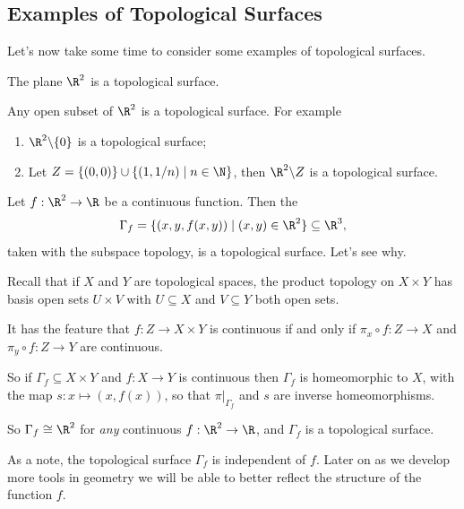 \subsection{Examples of Topological Surfaces}

Let's now take some time to consider some examples of topological surfaces.

\begin{example}[$\R^2$]
    The plane $\R^2$ is a topological surface.
\end{example}

\begin{example}[Subsets of $\R^2$]
    Any open subset of $\R^2$ is a topological surface. For example
    \begin{enumerate}[label=(\roman*)]
        \item $\R^2 \backslash \{0\}$ is a topological surface;
        \item Let $Z = \{(0, 0) \} \cup \{(1, 1/n) \mid n \in \N\}$, then $\R^2 \backslash Z$ is a topological surface.
    \end{enumerate}
\end{example}

\begin{example}[Graphs]
    Let $f: \R^2 \rightarrow \R$ be a continuous function. Then the  
    $$\Gamma_f = \{(x, y, f(x, y)) \mid (x, y) \in \R^2\} \subseteq \R^3,$$
    taken with the subspace topology, is a topological surface. Let's see why.
    
    Recall that if $X$ and $Y$ are topological spaces, the product topology on $X \times Y$ has basis open sets $U \times V$ with $U \subseteq X$ and $V \subseteq Y$ both open sets.

    It has the feature that $f: Z \rightarrow X \times Y$ is continuous if and only if $\pi_x \circ f: Z \rightarrow X$ and $\pi_y \circ f: Z \rightarrow Y$ are continuous.

    So if $\Gamma_f \subseteq X \times Y$ and $f: X \rightarrow Y$ is continuous then $\Gamma_f$ is homeomorphic to $X$, with the map $s: x \mapsto (x, f(x))$, so that $\left.\pi\right|_{\Gamma_f}$ and $s$ are inverse homeomorphisms.

    So $\Gamma_f \cong \R^2$ for \emph{any} continuous $f: \R^2 \rightarrow \R$, and $\Gamma_f$ is a topological surface.
\end{example}

As a note, the topological surface $\Gamma_f$ is independent of $f$. Later on as we develop more tools in geometry we will be able to better reflect the structure of the function $f$. 

